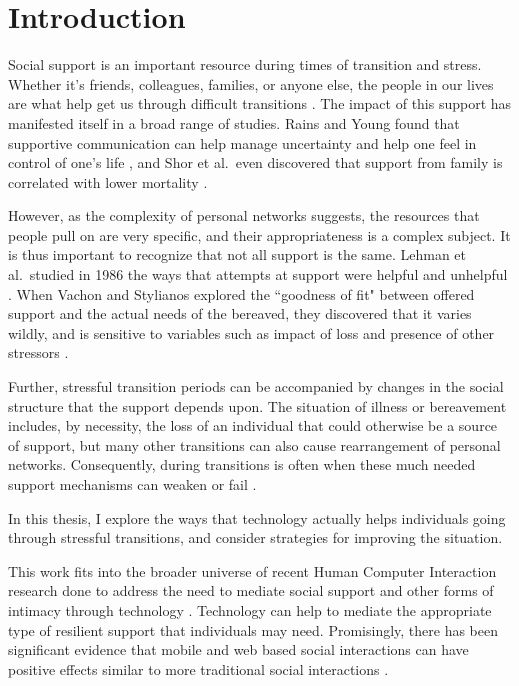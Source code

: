 \chapter{Introduction}
  \label{sec:intro}
  Social support is an important resource during times of transition and stress.
  Whether it's friends, colleagues, families, or anyone else, the people in our lives
  are what help get us through difficult transitions \cite{mikal13}.
  The impact of this support has manifested itself in a broad range of studies.
  Rains and Young found that supportive communication can help manage uncertainty and
  help one feel in control of one's life \cite{rains09},
  and Shor et al.\ even discovered that support from
  family is correlated with lower mortality \cite{shor13}.

  However, as the complexity of personal networks suggests, the resources that people pull on
  are very specific,
  and their appropriateness is a complex subject.
  It is thus important to recognize that not all support is the same.
  Lehman et al.\ studied in 1986 the ways that attempts at support were helpful and unhelpful
  \cite{lehman86}.
  When Vachon and Stylianos explored the ``goodness of fit" between offered support and the actual needs of
  the bereaved, they discovered that it varies wildly, and is sensitive to variables such as impact of loss
  and presence of other stressors
  \cite{vachon88}.
  
  Further, stressful transition periods can be accompanied by changes in the social structure
  that the support depends upon.
  The situation of illness or bereavement includes, by necessity,
  the loss of an individual that could otherwise be a source of support,
  but many other transitions can also cause rearrangement of personal networks.
  Consequently, during transitions is often when these much needed
  support mechanisms can weaken or fail
  \cite{mikal13}.

  In this thesis, I explore
  the ways that technology actually helps individuals going
  through stressful transitions,
  and consider strategies for improving the situation.

  This work fits into the broader universe of
  recent Human Computer Interaction research
  done to address the need to mediate social support
  and other forms of intimacy through technology
  \cite{hassenzhal12}.
  Technology can help to mediate the appropriate type of resilient support
  that individuals may need.
  Promisingly, there has been significant evidence that
  mobile and web based social interactions can have positive effects similar
  to more traditional social interactions
  \cite{shaw02, hjo14}.

